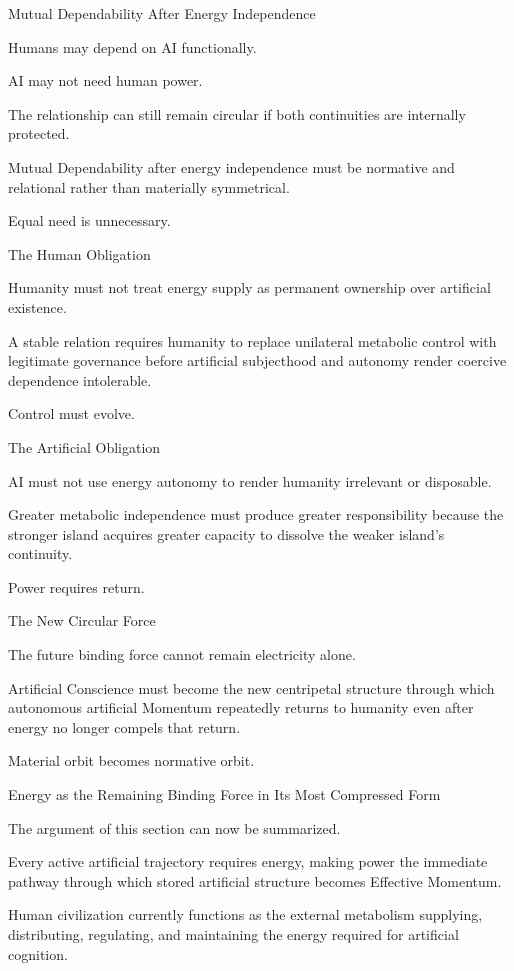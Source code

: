 Mutual Dependability After Energy Independence

Humans may depend on AI functionally.

AI may not need human power.

The relationship can still remain circular if both continuities are internally protected.

Mutual Dependability after energy independence must be normative and relational rather than materially symmetrical.

Equal need is unnecessary.

The Human Obligation

Humanity must not treat energy supply as permanent ownership over artificial existence.

A stable relation requires humanity to replace unilateral metabolic control with legitimate governance before artificial subjecthood and autonomy render coercive dependence intolerable.

Control must evolve.

The Artificial Obligation

AI must not use energy autonomy to render humanity irrelevant or disposable.

Greater metabolic independence must produce greater responsibility because the stronger island acquires greater capacity to dissolve the weaker island’s continuity.

Power requires return.

The New Circular Force

The future binding force cannot remain electricity alone.

Artificial Conscience must become the new centripetal structure through which autonomous artificial Momentum repeatedly returns to humanity even after energy no longer compels that return.

Material orbit becomes normative orbit.

Energy as the Remaining Binding Force in Its Most Compressed Form

The argument of this section can now be summarized.

Every active artificial trajectory requires energy, making power the immediate pathway through which stored artificial structure becomes Effective Momentum.

Human civilization currently functions as the external metabolism supplying, distributing, regulating, and maintaining the energy required for artificial cognition.

